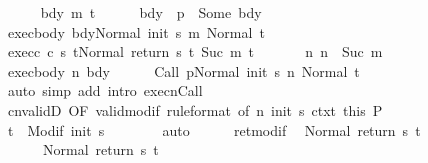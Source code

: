 \begin{isabellebody}
\ \ \ \ \isamarkupfalse%
\ bdy\ m\ t{\isacharprime}\isanewline
\ \ \ \ \isamarkupfalse%
\ bdy{\isacharcolon}\ {\isachardoublequoteopen}{\isasymGamma}\ p\ {\isacharequal}\ Some\ bdy{\isachardoublequoteclose}\isanewline
\ \ \ \ \isamarkupfalse%
\ exec{\isacharunderscore}body{\isacharcolon}\ {\isachardoublequoteopen}{\isasymGamma}{\isasymturnstile}{\isasymlangle}bdy{\isacharcomma}Normal\ {\isacharparenleft}init\ s{\isacharparenright}{\isasymrangle}\ {\isacharequal}m{\isasymRightarrow}\ Normal\ t{\isacharprime}{\isachardoublequoteclose}\ \isanewline
\ \ \ \ \isamarkupfalse%
\ exec{\isacharunderscore}c{\isacharcolon}\ {\isachardoublequoteopen}{\isasymGamma}{\isasymturnstile}{\isasymlangle}c\ s\ t{\isacharprime}{\isacharcomma}Normal\ {\isacharparenleft}return\ s\ t{\isacharprime}{\isacharparenright}{\isasymrangle}\ {\isacharequal}Suc\ m{\isasymRightarrow}\ t{\isachardoublequoteclose}\ \isanewline
\ \ \ \ \isamarkupfalse%
\ n{\isacharcolon}\ {\isachardoublequoteopen}n\ {\isacharequal}\ Suc\ m{\isachardoublequoteclose}\isanewline
\ \ \ \ \isamarkupfalse%
\ exec{\isacharunderscore}body\ n\ bdy\isanewline
\ \ \ \ \isamarkupfalse%
\ {\isachardoublequoteopen}{\isasymGamma}{\isasymturnstile}{\isasymlangle}Call\ p{\isacharcomma}Normal\ {\isacharparenleft}init\ s{\isacharparenright}{\isasymrangle}\ {\isacharequal}n{\isasymRightarrow}\ Normal\ t{\isacharprime}{\isachardoublequoteclose}\isanewline
\ \ \ \ \ \ \isamarkupfalse%
\ {\isacharparenleft}auto\ simp\ add{\isacharcolon}\ intro{\isacharcolon}\ execn{\isachardot}Call{\isacharparenright}\isanewline
\ \ \ \ \isamarkupfalse%
\ cnvalidD\ {\isacharbrackleft}OF\ valid{\isacharunderscore}modif\ {\isacharbrackleft}rule{\isacharunderscore}format{\isacharcomma}\ of\ n\ {\isachardoublequoteopen}init\ s{\isachardoublequoteclose}{\isacharbrackright}\ ctxt{\isacharprime}\ this{\isacharbrackright}\ P\isanewline
\ \ \ \ \isamarkupfalse%
\ {\isachardoublequoteopen}t{\isacharprime}\ {\isasymin}\ Modif\ {\isacharparenleft}init\ s{\isacharparenright}{\isachardoublequoteclose}\isanewline
\ \ \ \ \ \ \isamarkupfalse%
\ auto\isanewline
\ \ \ \ \isamarkupfalse%
\ ret{\isacharunderscore}modif\ \isamarkupfalse%
\ {\isachardoublequoteopen}Normal\ {\isacharparenleft}return{\isacharprime}\ s\ t{\isacharprime}{\isacharparenright}\ {\isacharequal}\ \isanewline
\ \ \ \ \ \ Normal\ {\isacharparenleft}return\ s\ t{\isacharprime}{\isacharparenright}{\isachardoublequoteclose}\isanewline

\end{isabellebody}
